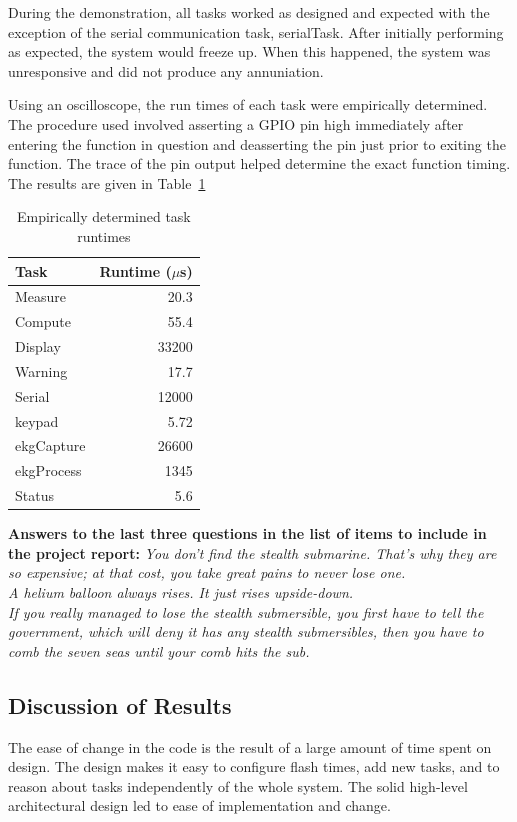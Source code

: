 \documentclass[12pt]{article} %
\begin{document}
    During the demonstration, all tasks worked as designed and expected with
    the exception of the serial communication task, serialTask. After initially
    performing as expected, the system would freeze up. When this happened, the
    system was unresponsive and did not produce any annuniation.

    Using an oscilloscope, the run times of each task were empirically
		determined. The procedure used involved asserting a GPIO pin high
		immediately after entering the function in question and deasserting the pin
		just prior to exiting the function. The trace of the pin output helped
		determine the exact function timing. The results are given in
		Table~\ref{tab:taskRuntimes}

    \begin{table}[h]
      \centering
      \begin{tabular}{|l|r|} 
	\hline
	Task & Runtime ($\mu$s) \\ \hline
	Measure & 20.3 \\ \hline
	Compute & 55.4 \\ \hline
	Display & 33200 \\ \hline
	Warning & 17.7 \\ \hline
    Serial & 12000 \\ \hline
    keypad & 5.72 \\ \hline
    ekgCapture & 26600 \\ \hline
    ekgProcess & 1345 \\ \hline
	Status & 5.6 \\ \hline
      \end{tabular}
      \caption{Empirically determined task runtimes}
      \label{tab:taskRuntimes}
    \end{table}

    \textbf{Answers to the last three questions in the list of items to include
    in the project report:}
    \emph{You don't find the stealth submarine. That's why they are so expensive; at that cost, you take great pains to never lose one.\\  A helium balloon always rises. It just rises upside-down. \\ If you really managed to lose the stealth submersible, you first have to tell the government, which will deny it has any stealth submersibles, then you have to comb the seven seas until your comb hits the sub.}

    \subsection{Discussion of Results}
    The ease of change in the code is the result of a large amount of time spent on
    design. The design makes it easy to configure flash times, add new tasks, and
    to reason about tasks independently of the whole system. The solid high-level
    architectural design led to ease of implementation and change.
\end{document}
